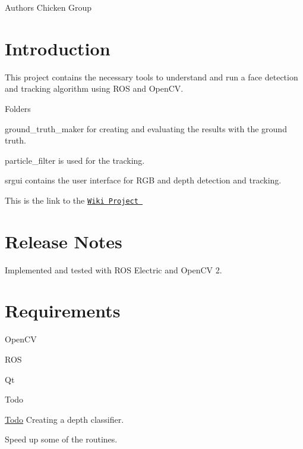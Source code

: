 \begin{DoxyAuthor}{Authors}
Chicken Group
\end{DoxyAuthor}
\hypertarget{index_intro}{}\section{Introduction}\label{index_intro}
This project contains the necessary tools to understand and run a face detection and tracking algorithm using R\-O\-S and Open\-C\-V.


\begin{DoxyItemize}
\item Folders
\end{DoxyItemize}
\begin{DoxyEnumerate}
\item ground\-\_\-truth\-\_\-maker for creating and evaluating the results with the ground truth.
\item particle\-\_\-filter is used for the tracking.
\item srgui contains the user interface for R\-G\-B and depth detection and tracking.
\end{DoxyEnumerate}

This is the link to the \href{http://code.google.com/p/scoialrobot/}{\tt Wiki Project }



 \hypertarget{index_notes}{}\section{Release Notes}\label{index_notes}
Implemented and tested with R\-O\-S Electric and Open\-C\-V 2. 

 \hypertarget{index_requirements}{}\section{Requirements}\label{index_requirements}

\begin{DoxyItemize}
\item Open\-C\-V
\item R\-O\-S
\item Qt 

 \begin{DoxyRefDesc}{Todo}
\item[\hyperlink{todo__todo000001}{Todo}]Creating a depth classifier. 

Speed up some of the routines.\end{DoxyRefDesc}

\end{DoxyItemize}